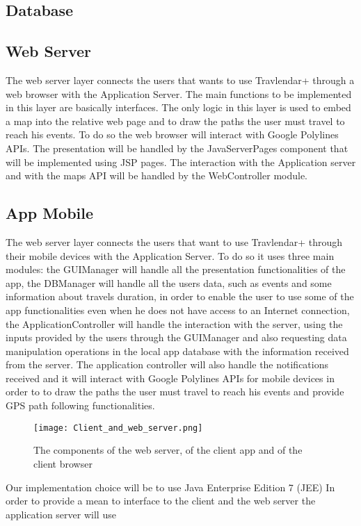 \subsection{Database}
\label{subsect:Database}

\subsection{Web Server}
\label{subsect:Web Server}
	The web server layer connects the users that wants to use Travlendar+ through a web browser with the Application Server. \newline
	The main functions to be implemented in this layer are basically interfaces.
	The only logic in this layer is used to embed a map into the relative web page and to draw the paths the user must travel to reach his events. To do so the web browser will interact with Google Polylines APIs.\newline
	The presentation will be handled by the JavaServerPages component that will be implemented using JSP pages. The interaction with the Application server and with the maps API will be handled by the WebController module.

\subsection{App Mobile}
\label{subsect:App Mobile}
	The web server layer connects the users that want to use Travlendar+ through their mobile devices with the Application Server.
	To do so it uses three main modules: the GUIManager will handle all the presentation functionalities of the app, the DBManager will handle all the users data, such as events and some information about travels duration, in order to enable the user to use some of the app functionalities even when he does not have access to an Internet connection, the ApplicationController will handle the interaction with the server, using the inputs provided by the users through the GUIManager and also requesting data manipulation operations in the local app database with the information received from the server. The application controller will also handle the notifications received and it will interact with Google Polylines APIs for mobile devices in order to to draw the paths the user must travel to reach his events and provide GPS path following functionalities.
	
	
\begin{figure}[H]
\begin{center}
		\hspace*{-0pt}
		\texttt{[image: Client\_and\_web\_server.png]}
\end{center}
\caption{The components of the web server, of the client app and of the client browser}
\end{figure}
Our implementation choice will be to use Java Enterprise Edition 7 (JEE)
In order to provide a mean to interface to the client and the web server the application server will use 